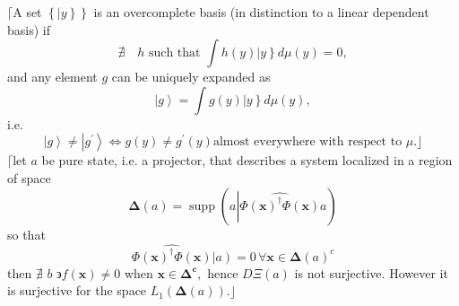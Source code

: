\documentclass[aps,preprint]{revtex4}%
\begin{document}
$\lceil$A set $\left\{  \left\vert y\right\}  \right\}  $ is an overcomplete
basis (in distinction to a linear dependent basis) if
\begin{equation}
\nexists\quad h\text{ such that }\int h\left(  y\right)  \left\vert y\right\}
d\mu\left(  y\right)  =0,
\end{equation}
and any element $g$ can be uniquely expanded as
\begin{equation}
\left\vert g\right\rangle =\int g\left(  y\right)  \left\vert y\right\}
d\mu\left(  y\right)  ,
\end{equation}
i.e.
\begin{equation}
\left\vert g\right\rangle \neq\left\vert g^{\prime}\right\rangle
\Leftrightarrow g\left(  y\right)  \neq g^{\prime}\left(  y\right)  \text{
almost everywhere with respect to }\mu.\rfloor
\end{equation}
$\lceil$let $a$ be pure state, i.e. a projector, that describes a system
localized in a region of space
\begin{equation}
\mathbf{\Delta}\left(  a\right)  =\operatorname*{supp}\left(  \overset{}{a}%
\left\vert \widehat{\Phi\left(  \mathbf{x}\right)  ^{\dagger}\Phi\left(
\mathbf{x}\right)  }\right.  \overset{}{a}\right)
\end{equation}
so that
\begin{equation}
\widehat{\Phi\left(  \mathbf{x}\right)  ^{\dagger}\Phi\left(  \mathbf{x}%
\right)  }\left\vert \overset{}{a}\right)  =0\,\forall\mathbf{x\in\Delta
}\left(  a\right)  ^{c}%
\end{equation}
then $\nexists$ $b$ $\backepsilon f\left(  \mathbf{x}\right)  \neq0$ when
$\mathbf{x\in\mathbf{\Delta}^{c},}$ hence $D\Xi\left(  a\right)  $ is not
surjective. However it is surjective for the space $L_{1}\left(
\mathbf{\Delta}\left(  a\right)  \right)  .\mathbf{\rfloor}$
\end{document}
